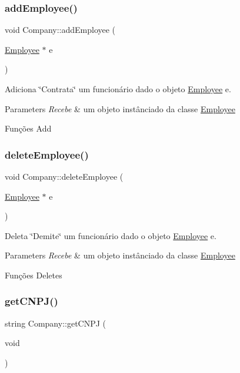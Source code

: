 \subsubsection{\texorpdfstring{add\+Employee()}{addEmployee()}}
{\footnotesize\ttfamily void Company\+::add\+Employee (\begin{DoxyParamCaption}\item[{\hyperlink{classEmployee}{Employee} $\ast$}]{e }\end{DoxyParamCaption})}



Adiciona \char`\"{}\+Contrata\char`\"{} um funcionário dado o objeto \hyperlink{classEmployee}{Employee} e. 


\begin{DoxyParams}{Parameters}
{\em Recebe} & um objeto instânciado da classe \hyperlink{classEmployee}{Employee}\\
\hline
\end{DoxyParams}
Funções Add \mbox{\label{classCompany_a7d23cae272c3646ed03485d15a8b9cb5}} 
\subsubsection{\texorpdfstring{delete\+Employee()}{deleteEmployee()}}
{\footnotesize\ttfamily void Company\+::delete\+Employee (\begin{DoxyParamCaption}\item[{\hyperlink{classEmployee}{Employee} $\ast$}]{e }\end{DoxyParamCaption})}



Deleta \char`\"{}\+Demite\char`\"{} um funcionário dado o objeto \hyperlink{classEmployee}{Employee} e. 


\begin{DoxyParams}{Parameters}
{\em Recebe} & um objeto instânciado da classe \hyperlink{classEmployee}{Employee}\\
\hline
\end{DoxyParams}
Funções Deletes \mbox{\label{classCompany_a6782268853d92085edbb3323d4bc72c5}} 
\subsubsection{\texorpdfstring{get\+C\+N\+P\+J()}{getCNPJ()}}
{\footnotesize\ttfamily string Company\+::get\+C\+N\+PJ (\begin{DoxyParamCaption}\item[{void}]{ }\end{DoxyParamCaption})}




